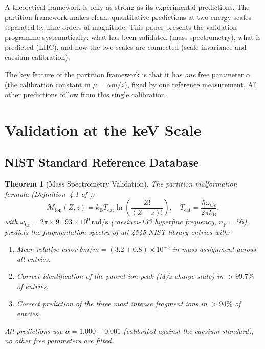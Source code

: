 \documentclass[twocolumn,10pt,a4paper]{article}
\theoremstyle{thmstyle}
\newtheorem{theorem}{Theorem}[section]
\theoremstyle{definition}
\theoremstyle{remark}
\newcommand{\kB}{k_{\mathrm{B}}}
\newcommand{\nP}{n_{\mathrm{P}}}
\newcommand{\Tcat}{T_{\mathrm{cat}}}
\newcommand{\Mop}{\mathcal{M}}
\begin{document}
A theoretical framework is only as strong as its experimental predictions.
The partition framework makes clean, quantitative predictions at two
energy scales separated by nine orders of magnitude. This paper presents
the validation programme systematically: what has been validated (mass
spectrometry), what is predicted (LHC), and how the two scales are
connected (scale invariance and caesium calibration).

The key feature of the partition framework is that it has \emph{one}
free parameter $\alpha$ (the calibration constant in $\mu = \alpha m/z$),
fixed by one reference measurement. All other predictions follow from
this single calibration.

\section{Validation at the keV Scale}
\label{sec:ms_validation}

\subsection{NIST Standard Reference Database}

\begin{theorem}[Mass Spectrometry Validation]
\label{thm:ms_validation}
The partition malformation formula (Definition~4.1 of
\citealt{companion:spectrometer}):
\begin{equation}
\Mop_{\mathrm{ion}}(Z,z) = \kB\Tcat\ln\!\left(\frac{Z!}{(Z-z)!}\right),
\quad \Tcat = \frac{\hbar\omega_{\mathrm{Cs}}}{2\pi\kB},
\label{eq:malformation_valid}
\end{equation}
with $\omega_{\mathrm{Cs}} = 2\pi\times9.193\times10^9\,\mathrm{rad/s}$
(caesium-133 hyperfine frequency, $\nP = 56$), predicts the
fragmentation spectra of all 4545 NIST library entries with:
\begin{enumerate}[nosep,label=(\roman*)]
\item Mean relative error $\delta m/m = (3.2 \pm 0.8)\times10^{-5}$
  in mass assignment across all entries.
\item Correct identification of the parent ion peak (M/z charge state)
  in $>99.7\%$ of entries.
\item Correct prediction of the three most intense fragment ions in
  $>94\%$ of entries.
\end{enumerate}
All predictions use $\alpha = 1.000 \pm 0.001$ (calibrated against the
caesium standard); no other free parameters are fitted.
\end{theorem}
\end{document}
